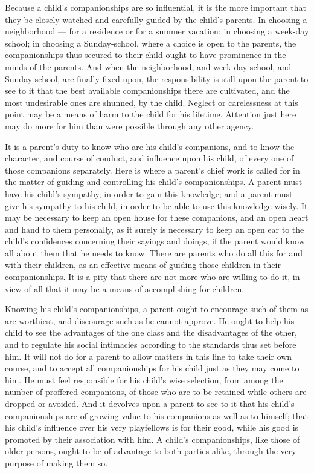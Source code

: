 \documentclass[
]{book}
\begin{document}
Because a child's companionships are so influential, it is the more important that they be closely watched and carefully guided by the child's parents. In choosing a neighborhood --- for a residence or for a summer vacation; in choosing a week-day school; in choosing a Sunday-school, where a choice is open to the parents, the companionships thus secured to their child ought to have prominence in the minds of the parents. And when the neighborhood, and week-day school, and Sunday-school, are finally fixed upon, the responsibility is still upon the parent to see to it that the best available companionships there are cultivated, and the most undesirable ones are shunned, by the child. Neglect or carelessness at this point may be a means of harm to the child for his lifetime. Attention just here may do more for him than were possible through any other agency.

It is a parent's duty to know who are his child's companions, and to know the character, and course of conduct, and influence upon his child, of every one of those companions separately. Here is where a parent's chief work is called for in the matter of guiding and controlling his child's companionships. A parent must have his child's sympathy, in order to gain this knowledge; and a parent must give his sympathy to his child, in order to be able to use this knowledge wisely. It may be necessary to keep an open house for these companions, and an open heart and hand to them personally, as it surely is necessary to keep an open ear to the child's confidences concerning their sayings and doings, if the parent would know all about them that he needs to know. There are parents who do all this for and with their children, as an effective means of guiding those children in their companionships. It is a pity that there are not more who are willing to do it, in view of all that it may be a means of accomplishing for children.

Knowing his child's companionships, a parent ought to encourage such of them as are worthiest, and discourage such as he cannot approve. He ought to help his child to see the advantages of the one class and the disadvantages of the other, and to regulate his social intimacies according to the standards thus set before him. It will not do for a parent to allow matters in this line to take their own course, and to accept all companionships for his child just as they may come to him. He must feel responsible for his child's wise selection, from among the number of proffered companions, of those who are to be retained while others are dropped or avoided. And it devolves upon a parent to see to it that his child's companionships are of growing value to his companions as well as to himself; that his child's influence over his very playfellows is for their good, while his good is promoted by their association with him. A child's companionships, like those of older persons, ought to be of advantage to both parties alike, through the very purpose of making them so.
\end{document}
